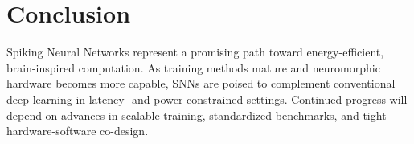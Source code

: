 \section{Conclusion}
\label{sec:conclusion}


Spiking Neural Networks represent a promising path toward energy-efficient,
brain-inspired computation. As training methods mature and neuromorphic
hardware becomes more capable, SNNs are poised to complement conventional deep
learning in latency- and power-constrained settings. Continued progress will
depend on advances in scalable training, standardized benchmarks, and tight
hardware-software co-design.
